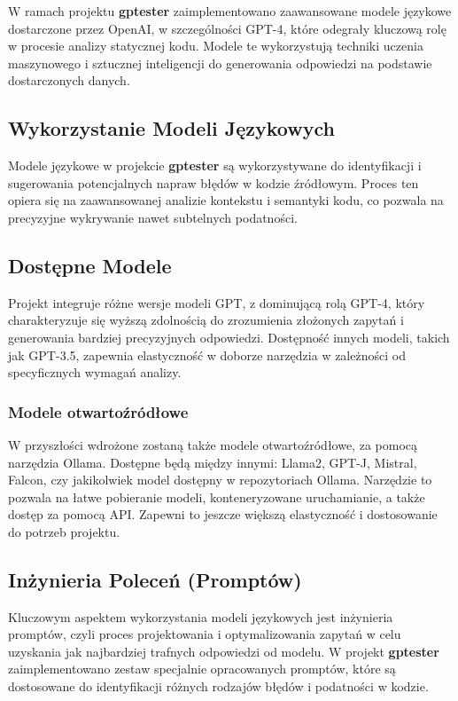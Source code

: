 W ramach projektu \textbf{gptester} zaimplementowano zaawansowane modele językowe dostarczone przez OpenAI, w szczególności GPT-4, które odegrały kluczową rolę w procesie analizy statycznej kodu. Modele te wykorzystują techniki uczenia maszynowego i sztucznej inteligencji do generowania odpowiedzi na podstawie dostarczonych danych.

\subsection{Wykorzystanie Modeli Językowych}
Modele językowe w projekcie \textbf{gptester} są wykorzystywane do identyfikacji i sugerowania potencjalnych napraw błędów w kodzie źródłowym. Proces ten opiera się na zaawansowanej analizie kontekstu i semantyki kodu, co pozwala na precyzyjne wykrywanie nawet subtelnych podatności.

\subsection{Dostępne Modele}
Projekt integruje różne wersje modeli GPT, z dominującą rolą GPT-4, który charakteryzuje się wyższą zdolnością do zrozumienia złożonych zapytań i generowania bardziej precyzyjnych odpowiedzi. Dostępność innych modeli, takich jak GPT-3.5, zapewnia elastyczność w doborze narzędzia w zależności od specyficznych wymagań analizy. 

\subsubsection{Modele otwartoźródłowe}
W przyszłości wdrożone zostaną także modele otwartoźródłowe, za pomocą narzędzia Ollama. Dostępne będą między innymi: Llama2, GPT-J, Mistral, Falcon, czy jakikolwiek model dostępny w repozytoriach Ollama. Narzędzie to pozwala na łatwe pobieranie modeli, konteneryzowane uruchamianie, a także dostęp za pomocą API. Zapewni to jeszcze większą elastyczność i dostosowanie do potrzeb projektu.

\subsection{Inżynieria Poleceń (Promptów)}
Kluczowym aspektem wykorzystania modeli językowych jest inżynieria promptów, czyli proces projektowania i optymalizowania zapytań w celu uzyskania jak najbardziej trafnych odpowiedzi od modelu. W projekt \textbf{gptester} zaimplementowano zestaw specjalnie opracowanych promptów, które są dostosowane do identyfikacji różnych rodzajów błędów i podatności w kodzie.


